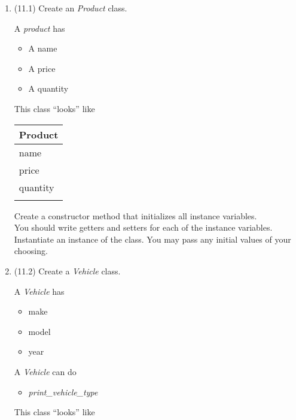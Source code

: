 \documentclass{article}
\begin{document}
\begin{enumerate}
\item (11.1) Create an \textit{Product} class.\\
	\begin{minipage}{.6\textwidth}
		A \textit{product} has
		\begin{itemize}
			\item A name
			\item A price
			\item A quantity	
		\end{itemize}
	\end{minipage} 
	\begin{minipage}{.4\textwidth}
		This class ``looks'' like 
				
		\vspace*{1em}
		\begin{tabular}{|l|}
			\hline Product\\ \hline
			name\\ price\\ quantity\\ \hline
			\\  \hline
		\end{tabular}
	\end{minipage}

	\vspace*{2ex}
	Create a constructor method that initializes all instance variables.\\
	You should write getters and setters for each of the instance variables.\\
	Instantiate an instance of the class. You may pass any initial values of your choosing.

\item (11.2) Create a \textit{Vehicle} class.\\
	\begin{minipage}{.6\textwidth}	
		A \textit{Vehicle} has
		\begin{itemize}
			\item make 
			\item model
			\item year	
		\end{itemize}
		
		A \textit{Vehicle} can do
		\begin{itemize}
			\item \textit{print\_vehicle\_type}
		\end{itemize}
	\end{minipage}
	\begin{minipage}{.4\textwidth}
		This class ``looks'' like 
				

\end{minipage}
\end{enumerate}
\end{document}
